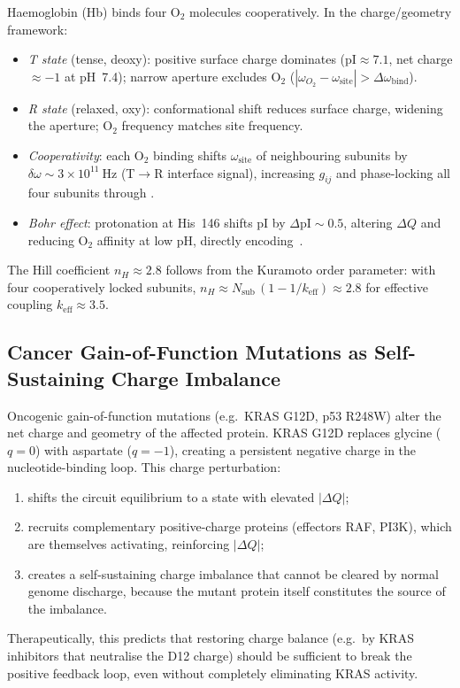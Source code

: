 Haemoglobin (Hb) binds four O$_2$ molecules cooperatively.  In the
charge/geometry framework:
\begin{itemize}[nosep]
    \item \emph{T state} (tense, deoxy): positive surface charge dominates
          ($\mathrm{pI}\approx 7.1$, net charge $\approx -1$ at pH~7.4);
          narrow aperture excludes O$_2$ ($|\omega_{O_2}-\omega_{\mathrm{site}}|>
          \Delta\omega_{\mathrm{bind}}$).
    \item \emph{R state} (relaxed, oxy): conformational shift reduces surface
          charge, widening the aperture; O$_2$ frequency matches site frequency.
    \item \emph{Cooperativity}: each O$_2$ binding shifts $\omega_{\mathrm{site}}$
          of neighbouring subunits by $\delta\omega\sim 3\times 10^{11}~\mathrm{Hz}$
          (T$\to$R interface signal), increasing $g_{ij}$ and phase-locking all
          four subunits through .
    \item \emph{Bohr effect}: protonation at His~146 shifts pI by $\Delta\mathrm{pI}
          \sim 0.5$, altering $\Delta Q$ and reducing O$_2$ affinity at low pH,
          directly encoding~.
\end{itemize}
The Hill coefficient $n_H\approx 2.8$ follows from the Kuramoto order
parameter: with four cooperatively locked subunits,
$n_H\approx N_{\mathrm{sub}}\,(1-1/k_{\mathrm{eff}})\approx 2.8$ for
effective coupling $k_{\mathrm{eff}}\approx 3.5$.

\subsection{Cancer Gain-of-Function Mutations as Self-Sustaining Charge Imbalance}

Oncogenic gain-of-function mutations (e.g.\ KRAS G12D, p53 R248W) alter the
net charge and geometry of the affected protein.  KRAS G12D replaces glycine
($q=0$) with aspartate ($q=-1$), creating a persistent negative charge in the
nucleotide-binding loop.  This charge perturbation:
\begin{enumerate}[nosep]
    \item shifts the circuit equilibrium to a state with elevated
          $|\Delta Q|$;
    \item recruits complementary positive-charge proteins (effectors RAF,
          PI3K), which are themselves activating, reinforcing $|\Delta Q|$;
    \item creates a self-sustaining charge imbalance that cannot be cleared
          by normal genome discharge, because the mutant protein itself
          constitutes the source of the imbalance.
\end{enumerate}
Therapeutically, this predicts that restoring charge balance (e.g.\ by KRAS
inhibitors that neutralise the D12 charge) should be sufficient to break the
positive feedback loop, even without completely eliminating KRAS activity.

